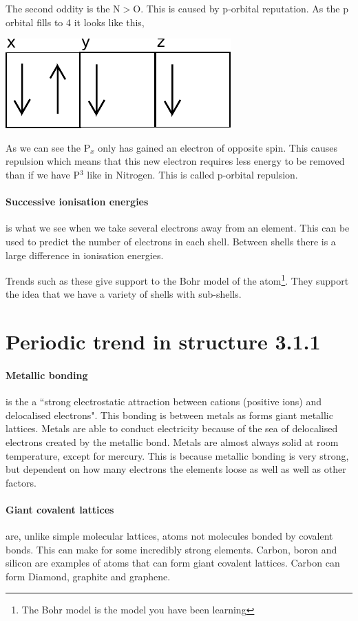 	The second oddity is the N$>$O. This is caused by p-orbital reputation. As the p orbital fills to 4 it looks like this,
	\begin{center}
		\includegraphics{P4orbital}
	\end{center}
	As we can see the P$_x$ only has gained an electron of opposite spin. This causes repulsion which means that this new electron requires less energy to be removed than if we have P$^3$ like in Nitrogen. This is called p-orbital repulsion.
	
	\paragraph{Successive ionisation energies} is what we see when we take several electrons away from an element. This can be used to predict the number of electrons in each shell. Between shells there is a large difference in ionisation energies.
	
	Trends such as these give support to the Bohr model of the atom\footnote{The Bohr model is the model you have been learning}. They support the idea that we have a variety of shells with sub-shells.
	
\section{Periodic trend in structure 3.1.1}
	
	\paragraph{Metallic bonding} is the a ``strong electrostatic attraction between cations (positive ions) and delocalised electrons". This bonding is between metals as forms giant metallic lattices. Metals are able to conduct electricity because of the sea of delocalised electrons created by the metallic bond. Metals are almost always solid at room temperature, except for mercury. This is because metallic bonding is very strong, but dependent on how many electrons the elements loose as well as well as other factors.
	
	\paragraph{Giant covalent lattices} are, unlike simple molecular lattices, atoms not molecules bonded by covalent bonds. This can make for some incredibly strong elements. Carbon, boron and silicon are examples of atoms that can form giant covalent lattices. Carbon can form Diamond, graphite and graphene.
	
